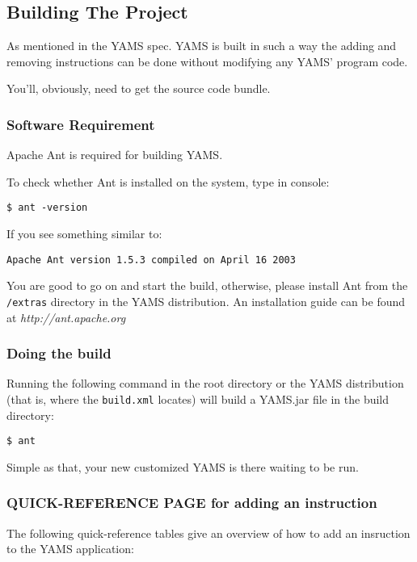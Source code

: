 \subsection{Building The Project}

As mentioned in the YAMS spec. YAMS is built in such a way the
adding and removing instructions can be done without modifying any
YAMS' program code.

You'll, obviously, need to get the source code bundle.

\subsubsection{Software Requirement}

Apache Ant is required for building YAMS.

To check whether Ant is installed on the system, type in
console:

\texttt{\$ ant -version}

If you see something similar to:

\texttt{Apache Ant version 1.5.3 compiled on April 16 2003}

You are good to go on and start the build, otherwise, please
install Ant from the {\tt /extras} directory in the YAMS distribution.  An installation guide can be found at {\it http://ant.apache.org}

\subsubsection{Doing the build}

Running the following command in the root directory or the YAMS
distribution (that is, where the \texttt{build.xml} locates) will
build a YAMS.jar file in the build directory:

\texttt{\$ ant}

Simple as that, your new customized YAMS is there waiting to be
run.










\subsubsection{QUICK-REFERENCE PAGE for adding an instruction}


The following quick-reference tables give an overview of how to add an insruction to the YAMS application:

